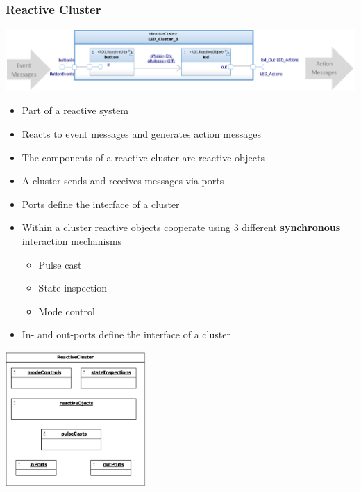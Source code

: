 \subsubsection{Reactive Cluster}
\includegraphics[width=1\textwidth]{images/ReactiveBehaviourNotation/cluster_example.png}
\begin{itemize}
    \item Part of a reactive system
    \item Reacts to event messages and generates action messages
    \item The components of a reactive cluster are reactive objects
    \item A cluster sends and receives messages via ports
    \item Ports define the interface of a cluster
    \item Within a cluster reactive objects cooperate using 3 different \textbf{synchronous} interaction mechanisms
          \begin{itemize}
              \item Pulse cast
              \item State inspection
              \item Mode control
          \end{itemize}
    \item In- and out-ports define the interface of a cluster
\end{itemize}
\includegraphics[width=0.4\textwidth]{images/ReactiveBehaviourNotation/meta_cluster.png}

